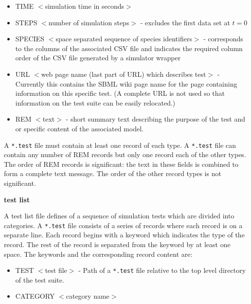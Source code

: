 \documentclass{cekarticle}
\begin{document}
\begin{itemize}

\item TIME $<$simulation time in seconds$>$

\item STEPS $<$number of simulation steps$>$ - excludes the first
data set at $t=0$

\item SPECIES $<$space separated sequence of species
identifiers$>$ - corresponds to the columns of the associated CSV
file and indicates the required column order of the CSV file
generated by a simulator wrapper

\item URL $<$web page name (last part of URL) which describes
test$>$ - Currently this contains the SBML wiki page name for the
page containing information on this specific test.  (A complete
URL is not used so that information on the test suite can be
easily relocated.)

\item REM $<$text$>$ - short summary text describing the purpose
of the test and or specific content of the associated model.

\end{itemize}

A \texttt{*.test} file must contain at least one record of each
type.  A \texttt{*.test} file can contain any number of REM
records but only one record each of the other types. The order of
REM records is significant: the text in these fields is combined
to form a complete text message. The order of the other record
types is not significant.

\textbf{test list}

A test list file defines of a sequence of simulation tests which
are divided into categories. A \texttt{*.test} file consists of a
series of records where each record is on a separate line. Each
record begins with a keyword which indicates the type of the
record.  The rest of the record is separated from the keyword by
at least one space.  The keywords and the corresponding record
content are:

\begin{itemize}

\item TEST $<$test file$>$ - Path of a \texttt{*.test} file
relative to the top level directory of the test suite.

\item CATEGORY $<$category name$>$

\end{itemize}
\end{document}
